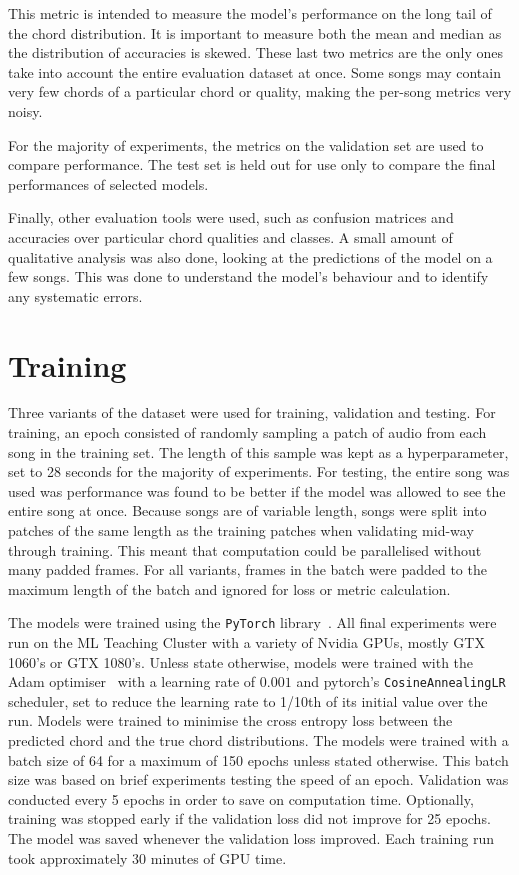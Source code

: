 This metric is intended to measure the model's performance on the long tail of the chord distribution. It is important to measure both the mean and median as the distribution of accuracies is skewed. These last two metrics are the only ones take into account the entire evaluation dataset at once. Some songs may contain very few chords of a particular chord or quality, making the per-song metrics very noisy.

For the majority of experiments, the metrics on the validation set are used to compare performance. The test set is held out for use only to compare the final performances of selected models.

Finally, other evaluation tools were used, such as confusion matrices and accuracies over particular chord qualities and classes. A small amount of qualitative analysis was also done, looking at the predictions of the model on a few songs. This was done to understand the model's behaviour and to identify any systematic errors.

\section{Training}\label{sec:training}

Three variants of the dataset were used for training, validation and testing. For training, an epoch consisted of randomly sampling a patch of audio from each song in the training set. The length of this sample was kept as a hyperparameter, set to 28 seconds for the majority of experiments. For testing, the entire song was used was performance was found to be better if the model was allowed to see the entire song at once. Because songs are of variable length, songs were split into patches of the same length as the training patches when validating mid-way through training. This meant that computation could be parallelised without many padded frames. For all variants, frames in the batch were padded to the maximum length of the batch and ignored for loss or metric calculation.

The models were trained using the \texttt{PyTorch} library~\citep{pytorch}. All final experiments were run on the ML Teaching Cluster with a variety of Nvidia GPUs, mostly GTX 1060's or GTX 1080's. Unless state otherwise, models were trained with the Adam optimiser~\citep{adam} with a learning rate of $0.001$ and pytorch's \texttt{CosineAnnealingLR} scheduler, set to reduce the learning rate to 1/10th of its initial value over the run. Models were trained to minimise the cross entropy loss between the predicted chord and the true chord distributions. The models were trained with a batch size of 64 for a maximum of 150 epochs unless stated otherwise. This batch size was based on brief experiments testing the speed of an epoch. Validation was conducted every 5 epochs in order to save on computation time. Optionally, training was stopped early if the validation loss did not improve for 25 epochs. The model was saved whenever the validation loss improved. Each training run took approximately 30 minutes of GPU time. 

